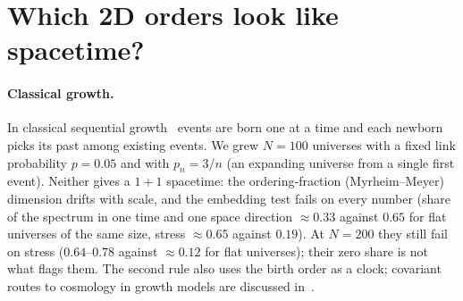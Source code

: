 \documentclass[11pt,a4paper]{article}
\begin{document}
\section{Which 2D orders look like spacetime?}\label{sec:phases}
\paragraph{Classical growth.} In classical sequential growth~\cite{RideoutSorkin00} events are born one at a time and each newborn picks its past among existing events. We grew $N=100$ universes with a fixed link probability $p=0.05$ and with $p_n=3/n$ (an expanding universe from a single first event). Neither gives a $1+1$ spacetime: the ordering-fraction (Myrheim--Meyer) dimension drifts with scale, and the embedding test fails on every number (share of the spectrum in one time and one space direction $\approx0.33$ against $0.65$ for flat universes of the same size, stress $\approx0.65$ against $0.19$). At $N=200$ they still fail on stress ($0.64$--$0.78$ against $\approx0.12$ for flat universes); their zero share is not what flags them. The second rule also uses the birth order as a clock; covariant routes to cosmology in growth models are discussed in~\cite{MORS01,AhmedRideout10}.
\end{document}
